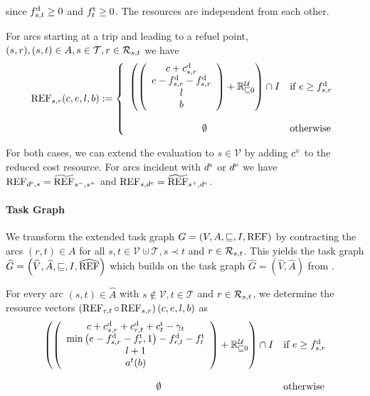 since $f^{\operatorname{d}}_{s,t}\geq 0$ and $f^{\operatorname{t}}_t\geq 0$. The resources are independent from each other.

For arcs starting at a trip and leading to a refuel point, \ie ${(s,r),(s,t)\in A}, {s\in\mathcal{T}}, {r\in\mathcal{R}_{s,t}}$ we have
\begin{align*}
	\operatorname{REF}_{s,r}(c,e,l,b) := \left\{ \begin{array}{cl}
		\left(\left( \begin{array}{c}
			c + c^{\operatorname{d}}_{s,r} \\ e - f^{\operatorname{d}}_{s,r} - f^{\operatorname{d}}_{s,r} \\ l \\ b
		\end{array} \right) + \mathbb{R}^{\mathcal{U}}_{\sqsubseteq 0}\right) \cap I & \text{if } e\geq f^{\operatorname{d}}_{s,r} \\
		\\
		\emptyset & \text{otherwise}
	\end{array} \right.
\end{align*}

For both cases, we can extend the evaluation to $s\in\mathcal{V}$ by adding $c^{\operatorname{v}}$ to the reduced cost resource. For arcs incident with $d^{\operatorname{s}}$ or $d^{\operatorname{e}}$ we have ${\operatorname{REF}_{d^{\operatorname{s}},s}=\widetilde{\operatorname{REF}}_{s^-,s^+}}$ and ${\operatorname{REF}_{s,d^{\operatorname{e}}}=\widetilde{\operatorname{REF}}_{s^+,d^{\operatorname{e}}}}$.

\paragraph{Task Graph} \parfill

We transform the extended task graph ${G=\left(V,A,\sqsubseteq,I,\operatorname{REF}\right)}$ by contracting the arcs ${(r,t)\in A}$ for all ${s,t\in\mathcal{V}\cupdot\mathcal{T}}, {s\prec t}$ and ${r\in\mathcal{R}_{s,t}}$. This yields the task graph ${\widehat{G}=\left(\widehat{V},\widehat{A},\sqsubseteq,I,\widehat{\operatorname{REF}}\right)}$ which builds on the task graph ${\widehat{G}=\left(\widehat{V},\widehat{A}\right)}$ from . 

For every arc $(s,t)\in\widehat{A}$ with $s\notin\mathcal{V}, t\in\mathcal{T}$ and $r\in\mathcal{R}_{s,t}$, we determine the resource vectors ${\left(\operatorname{REF}_{r,t}\circ\operatorname{REF}_{s,r}\right)(c,e,l,b)}$ as
\begin{align*}
	\begin{array}{cl}
		\left(\left( \begin{array}{c}
			c + c^{\operatorname{d}}_{s,r} + c^{\operatorname{d}}_{r,t} + c^{\operatorname{t}}_t - \gamma_t \\ \min\left(e-f^{\operatorname{d}}_{s,r}-f^{\operatorname{t}}_r, 1\right) - f^{\operatorname{d}}_{r,t} - f^{\operatorname{t}}_t \\ l + 1 \\ a^t(b)
		\end{array} \right) + \mathbb{R}^{\mathcal{U}}_{\sqsubseteq 0} \right) \cap I & \text{if } e\geq f^{\operatorname{d}}_{s,r} \\
		\\
		\emptyset & \text{otherwise}
	\end{array}
\end{align*}

